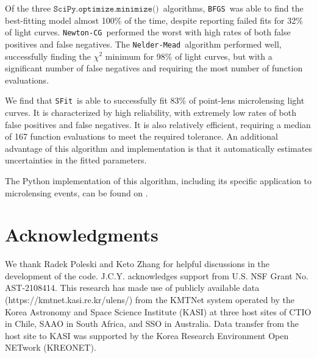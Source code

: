 \documentclass[preprint]{aastex631}
\newcommand{\minimize}{$\texttt{SciPy.optimize.minimize()}$}
\newcommand{\neldermead}{\texttt{Nelder-Mead}}
\newcommand{\newtoncg}{\texttt{Newton-CG}}
\newcommand{\bfgs}{\texttt{BFGS}}
\newcommand{\sfit}{\texttt{SFit}}
\begin{document}
Of the three \minimize\, algorithms, \bfgs\, was able to find the best-fitting model almost 100\% of the time, despite reporting failed fits for 32\% of light curves. \newtoncg\, performed the worst with high rates of both false positives and false negatives. The \neldermead\, algorithm performed well, successfully finding the $\chi^2$ minimum for 98\% of light curves, but with a significant number of false negatives and requiring the most number of function evaluations.

We find that \sfit\, is able to successfully fit 83\% of point-lens microlensing light curves. It is characterized by high reliability, with extremely low rates of both false positives and false negatives. It is also relatively efficient, requiring a median of 167 function evaluations to meet the required tolerance. An additional advantage of this algorithm and implementation is that it automatically estimates uncertainties in the fitted parameters.


\vspace{12pt}
The Python implementation of this algorithm, including its specific application to microlensing events, can be found on .

\section*{Acknowledgments}

We thank Radek Poleski and Keto Zhang for helpful discussions in the development of the code.
J.C.Y. acknowledges support from U.S. NSF Grant No. AST-2108414. 
This research has made use of publicly available data 
(https://kmtnet.kasi.re.kr/ulens/) from the KMTNet system
operated by the Korea Astronomy and Space Science Institute
(KASI) at three host sites of CTIO in Chile, SAAO in South
Africa, and SSO in Australia. Data transfer from the host site to
KASI was supported by the Korea Research Environment
Open NETwork (KREONET).




\FloatBarrier
\newpage
\end{document}
